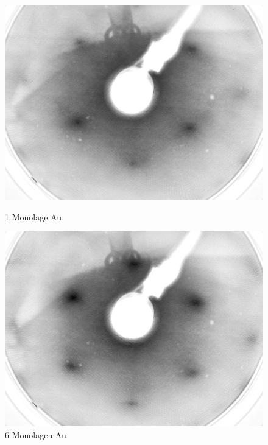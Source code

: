 \begin{figure}[htbp]
	\begin{minipage}[b]{0.5\textwidth} 
		\includegraphics[width=\textwidth]{LEED-Bilder/bearbeitet/1ML_E207}
		\caption{1 Monolage Au}
		\label{Bild} 
	\end{minipage}
	\hfill
	\begin{minipage}[b]{0.5\textwidth}
		\includegraphics[width=\textwidth]{LEED-Bilder/bearbeitet/6ML_E207}
		\caption{6 Monolagen Au}
		\label{Bild} 
	\end{minipage}
	

\end{figure}
